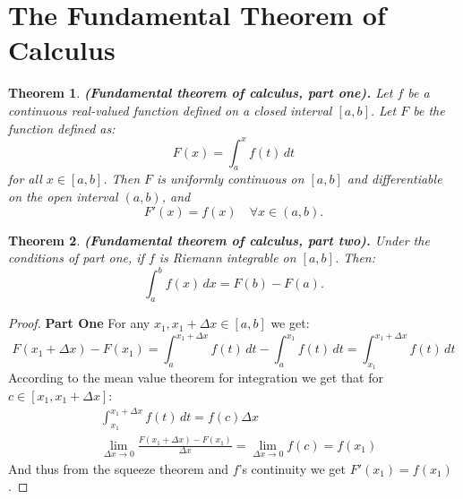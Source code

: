 \documentclass[11pt,a4paper]{article}
\theoremstyle{definition}
\theoremstyle{plain}
\newtheorem{theorem}{Theorem}[section]
\renewcommand{\tt}[1]{\textnormal{\textbf{(#1).}}} %
\begin{document}
  \section{The Fundamental Theorem of Calculus}
  \begin{theorem}\tt{Fundamental theorem of calculus, part one}
    Let $f$ be a continuous real-valued function
    defined on a closed interval $[a, b]$. 
    Let $F$ be the function defined as:
    \[
      F(x) = \int_{a}^{x} f(t)\,dt
    \]
    for all $x \in [a, b]$.
    Then $F$ is uniformly continuous on $[a, b]$ and 
    differentiable on the open interval $(a, b)$, and
    \[
      F'(x) = f(x) \quad \forall x \in (a, b).
    \]
  \end{theorem}
  \begin{theorem}\tt{Fundamental theorem of calculus, part two}
    Under the conditions of part one, if $f$ is Riemann integrable on $[a,b]$.
    Then:
    \[
      \int_{a}^{b} f(x)\,dx = F(b) - F(a).
    \]
  \end{theorem}
  \begin{proof}
  \textbf{Part One}
  For any $x_1, x_1+\Delta x\in [a,b]$ we get:
  \[
    F(x_1 + \Delta x) - F(x_1) = 
    \int_{a}^{x_1 + \Delta x}{f(t)\,dt} - \int_{a}^{x_1}{f(t)\,dt} = 
    \int_{x_1}^{x_1 + \Delta x}{f(t)\,dt}
  \]
  According to the mean value theorem for integration 
  we get that for $c \in [x_1, x_1+\Delta x]$:
  \begin{align*}
    &\int_{x_1}^{x_1 + \Delta x}{f(t)\,dt} = f(c)\Delta x \\
    &\lim_{\Delta x\to 0}{\frac{F(x_1+\Delta x) - F(x_1)}{\Delta x}}
    = \lim_{\Delta x\to 0}{f(c)}
    = f(x_1)
  \end{align*}
  And thus from the squeeze theorem and $f$'s continuity 
  we get $F'(x_1) = f(x_1)$.
  \end{proof}
\end{document}

